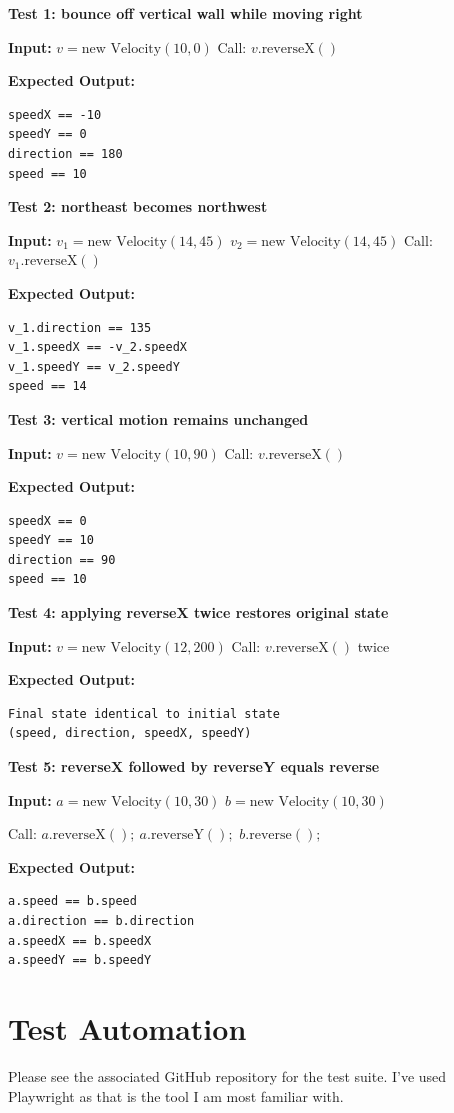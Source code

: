 \textbf{Test 1: bounce off vertical wall while moving right}

\textbf{Input:}  
$v = \text{new Velocity}(10, 0)$  
Call: $v.\text{reverseX}()$

\textbf{Expected Output:}
\begin{verbatim}
speedX == -10
speedY == 0
direction == 180
speed == 10
\end{verbatim}

\textbf{Test 2: northeast becomes northwest}

\textbf{Input:}  
$v_1 = \text{new Velocity}(14, 45)$  
$v_2 = \text{new Velocity}(14, 45)$  
Call: $v_1.\text{reverseX}()$

\textbf{Expected Output:}
\begin{verbatim}
v_1.direction == 135
v_1.speedX == -v_2.speedX
v_1.speedY == v_2.speedY
speed == 14
\end{verbatim}

\textbf{Test 3: vertical motion remains unchanged}

\textbf{Input:}  
$v = \text{new Velocity}(10, 90)$  
Call: $v.\text{reverseX}()$

\textbf{Expected Output:}
\begin{verbatim}
speedX == 0
speedY == 10
direction == 90
speed == 10
\end{verbatim}

\textbf{Test 4: applying reverseX twice restores original state}

\textbf{Input:}  
$v = \text{new Velocity}(12, 200)$  
Call: $v.\text{reverseX}()$ twice

\textbf{Expected Output:}
\begin{verbatim}
Final state identical to initial state
(speed, direction, speedX, speedY)
\end{verbatim}

\textbf{Test 5: reverseX followed by reverseY equals reverse}

\textbf{Input:}  
$a = \text{new Velocity}(10, 30)$  
$b = \text{new Velocity}(10, 30)$  

Call:  
$a.\text{reverseX}();\ a.\text{reverseY}();$  
$b.\text{reverse}();$

\textbf{Expected Output:}
\begin{verbatim}
a.speed == b.speed
a.direction == b.direction
a.speedX == b.speedX
a.speedY == b.speedY
\end{verbatim}

\section{Test Automation}
Please see the associated GitHub repository for the test suite. I've
used Playwright as that is the tool I am most familiar with.

